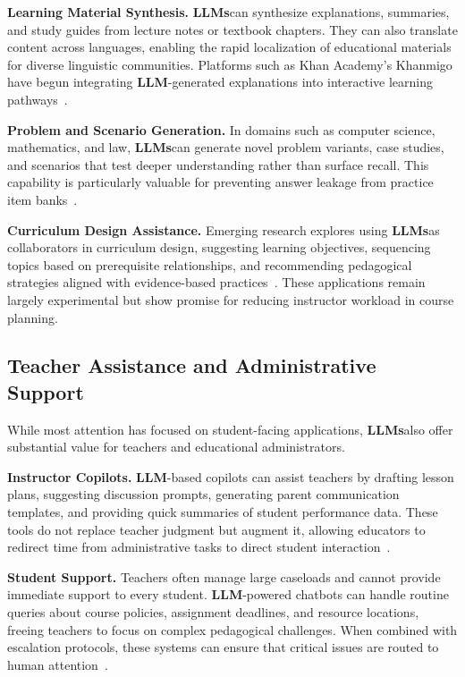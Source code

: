 \documentclass[preprint,12pt]{article}
\newcommand{\LLM}{\textbf{LLM}}
\newcommand{\LLMs}{\textbf{LLMs}}
\theoremstyle{mystyle}
\begin{document}
\textbf{Learning Material Synthesis.} \LLMs can synthesize explanations, summaries, and study guides from lecture notes or textbook chapters. They can also translate content across languages, enabling the rapid localization of educational materials for diverse linguistic communities. Platforms such as Khan Academy's Khanmigo have begun integrating \LLM-generated explanations into interactive learning pathways~\citep{khan2024khanmigo}.

\textbf{Problem and Scenario Generation.} In domains such as computer science, mathematics, and law, \LLMs can generate novel problem variants, case studies, and scenarios that test deeper understanding rather than surface recall. This capability is particularly valuable for preventing answer leakage from practice item banks~\citep{soll2024quizgen}.

\textbf{Curriculum Design Assistance.} Emerging research explores using \LLMs as collaborators in curriculum design, suggesting learning objectives, sequencing topics based on prerequisite relationships, and recommending pedagogical strategies aligned with evidence-based practices~\citep{pandey2024llmcurriculum}. These applications remain largely experimental but show promise for reducing instructor workload in course planning.

\subsection{Teacher Assistance and Administrative Support}
\label{sec:teacher_support}

While most attention has focused on student-facing applications, \LLMs also offer substantial value for teachers and educational administrators.

\textbf{Instructor Copilots.} \LLM-based copilots can assist teachers by drafting lesson plans, suggesting discussion prompts, generating parent communication templates, and providing quick summaries of student performance data. These tools do not replace teacher judgment but augment it, allowing educators to redirect time from administrative tasks to direct student interaction~\citep{baidoo2024teacherai}.

\textbf{Student Support.} Teachers often manage large caseloads and cannot provide immediate support to every student. \LLM-powered chatbots can handle routine queries about course policies, assignment deadlines, and resource locations, freeing teachers to focus on complex pedagogical challenges. When combined with escalation protocols, these systems can ensure that critical issues are routed to human attention~\citep{kasneci2023chatgpt}.
\end{document}
